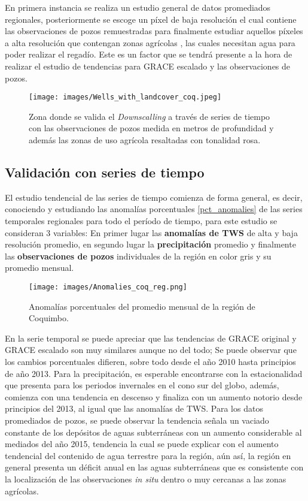 En primera instancia se realiza un estudio general de datos promediados regionales, 
posteriormente se escoge un píxel de baja resolución el cual contiene las observaciones de pozos remuestradas para finalmente estudiar aquellos píxeles a alta resolución que contengan zonas agrícolas \cite{LC}, las cuales necesitan agua para 
poder realizar el regadío. Este es un factor que se tendrá presente a la hora de realizar el estudio de tendencias para GRACE escalado y las observaciones de pozos.

\begin{figure}[H]
    \centering
          \texttt{[image: images/Wells\_with\_landcover\_coq.jpeg]}
          \vskip -0.1in
    \caption[Zona de validación con series de tiempo]{\footnotesize Zona donde se valida el \textit{Downscalling} a través de series de tiempo con las observaciones de pozos medida en metros de profundidad y además las zonas de uso agrícola resaltadas con tonalidad rosa.}
    \label{szcoq}
\end{figure}

\subsection{Validación con series de tiempo}
El estudio tendencial de las series de tiempo comienza de forma general, es decir, conociendo y estudiando las anomalías porcentuales \ref{pct_anomalies} de las series temporales regionales para todo el período de tiempo, para este estudio se consideran 3 variables: En primer lugar las \textbf{anomalías de TWS} de alta y baja resolución promedio, en segundo lugar la 
\textbf{precipitación} promedio y finalmente las \textbf{observaciones de pozos} individuales de la región en color gris y su promedio mensual.

\begin{figure}[H]
    \centering
          \texttt{[image: images/Anomalies\_coq\_reg.png]}
          \vskip -0.1in
    \caption[Series de tiempo para la región de Coquimbo]{\footnotesize Anomalías porcentuales del promedio mensual de la región de Coquimbo.}
    \label{tscoq}
\end{figure}
En la serie temporal se puede apreciar que las tendencias de GRACE original y GRACE escalado son muy similares aunque no del todo; Se puede observar que los cambios porcentuales difieren, sobre todo desde el año 2010 hasta principios de año 2013. Para la precipitación,
es esperable encontrarse con la estacionalidad que presenta para los periodos invernales en el cono sur del globo, además, comienza con una tendencia en descenso y finaliza con un aumento notorio desde principios del 2013, al igual que las anomalías de TWS. Para los datos promediados de pozos, 
se puede observar la tendencia señala un vaciado constante de los depósitos de aguas subterráneas con un aumento considerable al mediados del año 2015, tendencia la cual se puede explicar con el aumento tendencial del contenido de 
agua terrestre para la región, aún así, la región en general presenta un déficit anual en las aguas subterráneas que es consistente con la localización de las observaciones \textit{in situ} dentro o muy cercanas a las zonas agrícolas. 

